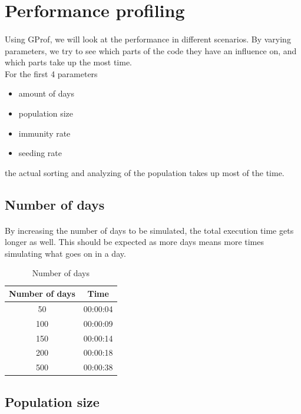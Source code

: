 \documentclass[runningheads]{llncs}
\begin{document}
\clearpage
\section{Performance profiling}

\paragraph{} Using GProf, we will look at the performance in different scenarios. By varying parameters, we try to see which parts of the code they have an influence on, and which parts take up the most time. 
\\
For the first 4 parameters
\begin{itemize}
	\item amount of days
	\item population size
	\item immunity rate
	\item seeding rate
\end{itemize}
the actual sorting and analyzing of the population takes up most of the time.

\subsection{Number of days}

\paragraph{} By increasing the number of days to be simulated, the total execution time gets longer as well. This should be expected as more days means more times simulating what goes on in a day.
\begin{table}[!h]
	\centering
	\begin{tabular}{|c|c|}
		\hline
		Number of days & Time \\\hline
		50  & 00:00:04 \\\hline
    	100 & 00:00:09 \\\hline
    	150 & 00:00:14 \\\hline
    	200	& 00:00:18 \\\hline
    	500 & 00:00:38 \\
    	\hline
	\end{tabular}
	\caption{Number of days}
\end{table}

\subsection{Population size}
\end{document}
